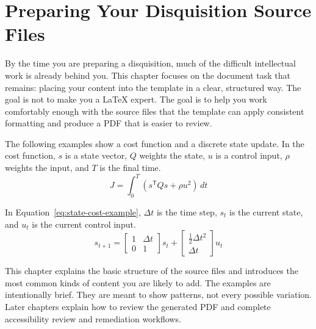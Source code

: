 \chapter{Preparing Your Disquisition Source Files}
\label{chap:preparing-source}

By the time you are preparing a disquisition, much of the difficult intellectual work is already behind you. This chapter focuses on the document task that remains: placing your content into the template in a clear, structured way. The goal is not to make you a \LaTeX{} expert. The goal is to help you work comfortably enough with the source files that the template can apply consistent formatting and produce a PDF that is easier to review.

The following examples show a cost function and a discrete state update. In the cost function, \(s\) is a state vector, \(Q\) weights the state, \(u\) is a control input, \(\rho\) weights the input, and \(T\) is the final time.
\begin{equation}
  J =
    \int_0^T
      \left(s^\mathsf{T} Qs + \rho u^2\right)
    \,dt
  \label{eq:stress-long}
\end{equation}

In Equation~\ref{eq:state-cost-example}, \(\Delta t\) is the time step, \(s_t\) is the current state, and \(u_t\) is the current control input.
\begin{equation}
  s_{t+1}
    =
    \begin{bmatrix}
      1 & \Delta t \\
      0 & 1
    \end{bmatrix}
    s_t
    +
    \begin{bmatrix}
      \frac{1}{2}\Delta t^2 \\
      \Delta t
    \end{bmatrix}
    u_t
\label{eq:state-cost-example}
\end{equation}

This chapter explains the basic structure of the source files and introduces the most common kinds of content you are likely to add. The examples are intentionally brief. They are meant to show patterns, not every possible variation. Later chapters explain how to review the generated PDF and complete accessibility review and remediation workflows.

